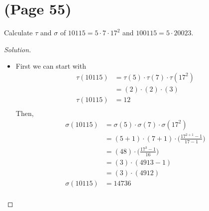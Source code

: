 \documentclass[11pt]{article}
\newenvironment{problem}[2][Problem]{\begin{trivlist}
\item[\hskip \labelsep {\bfseries #1}\hskip \labelsep {\bfseries #2.}]}{\end{trivlist}}
\newenvironment{solution}
  {\renewcommand\qedsymbol{$~$}\begin{proof}[Solution]$ $\par\nobreak\ignorespaces}
  {\end{proof}}
\begin{document}
\section{(Page 55)}


\begin{problem}{3}
Calculate $\tau$ and $\sigma$ of $10115 = 5\cdot 7\cdot 17^2$ and $100115=5\cdot 20023$.
\end{problem}

\begin{solution}
    \begin{itemize}
        \item[10115] First we can start with
              \begin{align*}
                  \tau(10115) & = \tau(5) \cdot \tau(7) \cdot \tau(17^2) \\
                              & = (2) \cdot (2) \cdot (3)                \\
                  \tau(10115) & = 12                                     \\
              \end{align*}
              Then,
              \begin{align*}
                  \sigma(10115) & = \sigma(5) \cdot \sigma(7) \cdot \sigma(17^2)                 \\
                                & = (5+1) \cdot (7+1) \cdot \bigg( \frac{17^{2+1}-1}{17-1}\bigg) \\
                                & = (48) \cdot \bigg( \frac{17^{3}-1}{16}\bigg)                  \\
                                & = (3) \cdot (4913-1)                                           \\
                                & = (3) \cdot (4912)                                             \\
                  \sigma(10115) & = 14736                                                        \\
              \end{align*}


\end{itemize}
\end{solution}
\end{document}
